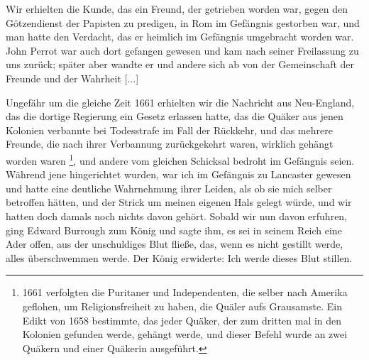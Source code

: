 Wir erhielten die Kunde, das ein Freund, der getrieben worden
war, gegen den Götzendienst der Papisten zu predigen, in Rom
im Gefängnis gestorben war, und man hatte den Verdacht, das
er heimlich im Gefängnis umgebracht worden war. John Perrot 
war auch dort gefangen gewesen und kam nach seiner Freilassung
zu uns zurück; später aber wandte er und andere sich ab von
der Gemeinschaft der Freunde und der Wahrheit [...]

Ungefähr um die gleiche Zeit 1661 erhielten wir die Nachricht 
aus Neu-England, das die dortige Regierung ein Gesetz
erlassen hatte, das die Quäker aus jenen Kolonien verbannte bei
Todesstrafe im Fall der Rückkehr, und das mehrere Freunde, die
nach ihrer Verbannung zurückgekehrt waren, wirklich gehängt
worden waren \footnote{1661 verfolgten die Puritaner und 
Independenten, die selber nach Amerika geflohen, um 
Religionsfreiheit zu haben, die Quäler aufs Grausamste.
Ein Edikt von 1658 bestimmte, das jeder Quäker, der zum dritten 
mal in den Kolonien gefunden werde, gehängt werde, und 
dieser Befehl wurde an zwei Quäkern und einer Quäkerin 
ausgeführt.}, und andere vom gleichen Schicksal bedroht im
Gefängnis seien. Während jene hingerichtet wurden, war ich im
Gefängnis zu Lancaster gewesen und hatte eine deutliche Wahrnehmung 
ihrer Leiden, als ob sie mich selber betroffen hätten,
und der Strick um meinen eigenen Hals gelegt würde, und wir
hatten doch damals noch nichts davon gehört. Sobald wir nun
davon erfuhren, ging Edward Burrough zum König und sagte
ihm, es sei in seinem Reich eine Ader offen, aus der unschuldiges
Blut fließe, das, wenn es nicht gestillt werde, alles überschwemmen
werde. Der König erwiderte: \glqq Ich werde dieses Blut stillen.\grqq